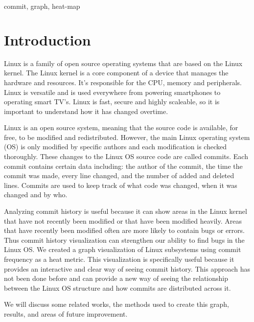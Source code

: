 \documentclass[conference]{IEEEtran}
\begin{document}
\begin{IEEEkeywords}
commit, graph, heat-map
\end{IEEEkeywords}

\section{Introduction}
Linux is a family of open source operating systems that are based on the Linux kernel. The Linux kernel is a core component of a device that manages the hardware and resources. It's responsible for the CPU, memory and peripherals. Linux is versatile and is used everywhere from powering smartphones to operating smart TV's. Linux is fast, secure and highly scaleable, so it is important to understand how it has changed overtime.%

Linux is an open source system, meaning that the source code is available, for free, to be modified and redistributed. However, the main Linux operating system (OS) is only modified by specific authors and each modification is checked thoroughly. These changes to the Linux OS source code are called commits. Each commit contains certain data including: the author of the commit, the time the commit was made, every line changed, and the number of added and deleted lines. Commits are used to keep track of what code was changed, when it was changed and by who. %


Analyzing commit history is useful because it can show areas in the Linux kernel that have not recently been modified or that have been modified heavily. Areas that have recently been modified often are more likely to contain bugs or errors. Thus commit history visualization can strengthen our ability to find bugs in the Linux OS. We created a graph visualization of Linux subsystems using commit frequency as a heat metric. This visualization is specifically useful because it provides an interactive and clear way of seeing commit history. This approach has not been done before and can provide a new way of seeing the relationship between the Linux OS structure and how commits are distributed across it. %

We will discuss some related works, the methods used to create this graph, results, and areas of future improvement.
\end{document}
